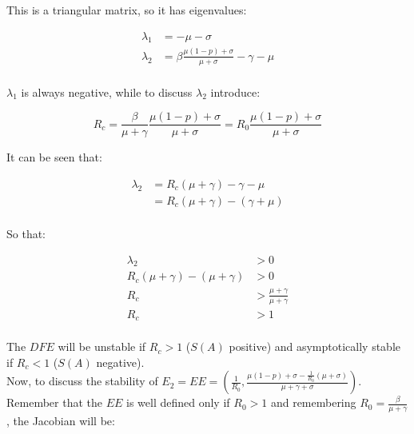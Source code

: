   This is a triangular matrix, so it has eigenvalues:

  \begin{align*}
    \lambda_1 &= -\mu-\sigma\\
    \lambda_2 &= \beta\frac{\mu(1-p)+\sigma}{\mu+\sigma}-\gamma-\mu\\
  \end{align*}

  $\lambda_1$ is always negative, while to discuss $\lambda_2$ introduce:

  $$R_c = \frac{\beta}{\mu+\gamma}\frac{\mu(1-p) +\sigma}{\mu + \sigma} = R_0\frac{\mu(1-p) + \sigma}{\mu+\sigma}$$

  It can be seen that:

  \begin{align*}
    \lambda_2 &= R_c(\mu+\gamma)-\gamma-\mu\\
              &= R_c(\mu+\gamma)-(\gamma+\mu)\\
  \end{align*}

  So that:

  \begin{align*}
    \lambda_2 &>0 \\
    R_c(\mu+\gamma)-(\mu+\gamma) &> 0\\
    R_c &> \frac{\mu+\gamma}{\mu+\gamma}\\
    R_c &> 1\\
  \end{align*}

  The $DFE$ will be unstable if $R_c>1$ ($S(A)$ positive) and asymptotically stable if $R_c < 1$ ($S(A)$ negative).\\
  Now, to discuss the stability of $E_2 = EE = \left(\frac{1}{R_0}, \frac{\mu(1-p) + \sigma - \frac{1}{R_0}(\mu+\sigma)}{\mu+\gamma+\sigma}\right)$.
  Remember that the $EE$ is well defined only if $R_0>1$ and remembering $R_0 = \frac{\beta}{\mu+\gamma}$, the Jacobian will be:

